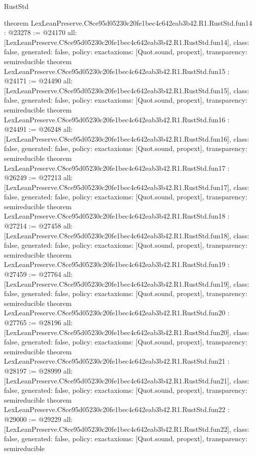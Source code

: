 \begin{lexlean}{RustStd}
\begin{coremodule}
{}
theorem LexLeanPreserve.C8ce95d05230c20fe1bec4c642eab3b42.R1.RustStd.fun14 : @23278 := @24170 {
  all: [LexLeanPreserve.C8ce95d05230c20fe1bec4c642eab3b42.R1.RustStd.fun14],
  class: false,
  generated: false,
  policy: exact{axioms: [Quot.sound, propext]},
  transparency: semireducible
}
theorem LexLeanPreserve.C8ce95d05230c20fe1bec4c642eab3b42.R1.RustStd.fun15 : @24171 := @24490 {
  all: [LexLeanPreserve.C8ce95d05230c20fe1bec4c642eab3b42.R1.RustStd.fun15],
  class: false,
  generated: false,
  policy: exact{axioms: [Quot.sound, propext]},
  transparency: semireducible
}
theorem LexLeanPreserve.C8ce95d05230c20fe1bec4c642eab3b42.R1.RustStd.fun16 : @24491 := @26248 {
  all: [LexLeanPreserve.C8ce95d05230c20fe1bec4c642eab3b42.R1.RustStd.fun16],
  class: false,
  generated: false,
  policy: exact{axioms: [Quot.sound, propext]},
  transparency: semireducible
}
theorem LexLeanPreserve.C8ce95d05230c20fe1bec4c642eab3b42.R1.RustStd.fun17 : @26249 := @27213 {
  all: [LexLeanPreserve.C8ce95d05230c20fe1bec4c642eab3b42.R1.RustStd.fun17],
  class: false,
  generated: false,
  policy: exact{axioms: [Quot.sound, propext]},
  transparency: semireducible
}
theorem LexLeanPreserve.C8ce95d05230c20fe1bec4c642eab3b42.R1.RustStd.fun18 : @27214 := @27458 {
  all: [LexLeanPreserve.C8ce95d05230c20fe1bec4c642eab3b42.R1.RustStd.fun18],
  class: false,
  generated: false,
  policy: exact{axioms: [Quot.sound, propext]},
  transparency: semireducible
}
theorem LexLeanPreserve.C8ce95d05230c20fe1bec4c642eab3b42.R1.RustStd.fun19 : @27459 := @27764 {
  all: [LexLeanPreserve.C8ce95d05230c20fe1bec4c642eab3b42.R1.RustStd.fun19],
  class: false,
  generated: false,
  policy: exact{axioms: [Quot.sound, propext]},
  transparency: semireducible
}
theorem LexLeanPreserve.C8ce95d05230c20fe1bec4c642eab3b42.R1.RustStd.fun20 : @27765 := @28196 {
  all: [LexLeanPreserve.C8ce95d05230c20fe1bec4c642eab3b42.R1.RustStd.fun20],
  class: false,
  generated: false,
  policy: exact{axioms: [Quot.sound, propext]},
  transparency: semireducible
}
theorem LexLeanPreserve.C8ce95d05230c20fe1bec4c642eab3b42.R1.RustStd.fun21 : @28197 := @28999 {
  all: [LexLeanPreserve.C8ce95d05230c20fe1bec4c642eab3b42.R1.RustStd.fun21],
  class: false,
  generated: false,
  policy: exact{axioms: [Quot.sound, propext]},
  transparency: semireducible
}
theorem LexLeanPreserve.C8ce95d05230c20fe1bec4c642eab3b42.R1.RustStd.fun22 : @29000 := @29229 {
  all: [LexLeanPreserve.C8ce95d05230c20fe1bec4c642eab3b42.R1.RustStd.fun22],
  class: false,
  generated: false,
  policy: exact{axioms: [Quot.sound, propext]},
  transparency: semireducible
}
\end{coremodule}
\end{lexlean}
